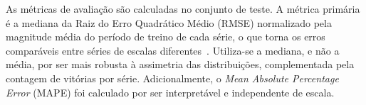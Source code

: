\documentclass[12pt]{article}
\begin{document}
\begin{table}[ht]
\centering

\caption{Espaço de busca de hiperparâmetros por modelo. Os mesmos valores são usados em todas as abordagens em que o modelo é utilizado.}
\label{tab:hiperparam}
\footnotesize
{}
\end{table}

As métricas de avaliação são calculadas no conjunto de teste. A métrica primária é a mediana da Raiz do Erro Quadrático Médio  (RMSE) normalizado pela magnitude média do período de treino de cada série, o que torna os erros comparáveis entre séries de escalas diferentes~\cite{hewamalage2023forecast}. Utiliza-se a mediana, e não a média, por ser mais robusta à assimetria das distribuições, complementada pela contagem de vitórias por série. Adicionalmente, o \emph{Mean Absolute Percentage Error} (MAPE) foi calculado por ser interpretável e independente de escala.
\end{document}

